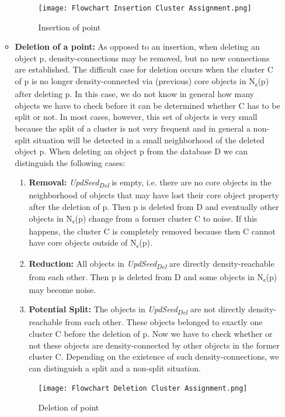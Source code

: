 \documentclass[acmsmall]{acmart}
\begin{document}
\begin{enumerate}
\begin{itemize}
        \begin{figure}[!h]
            \centering
            \texttt{[image: Flowchart Insertion Cluster Assignment.png]}
            \caption{Insertion of point}
            \label{fig:my_label}
        \end{figure}
        
        \item \textbf{Deletion of a point: }
        As opposed to an insertion, when deleting an object p, density-connections may be removed, but no new connections are established. The difficult case for deletion occurs when the cluster C of p is no longer density-connected via (previous) core objects in N\textsubscript{$\epsilon$}(p) after deleting p. In this case, we do not know in general how many objects we have to check before it can be determined whether C has to be split or not. In most cases, however, this set of objects is very small because the split of a cluster is not very frequent and in general a non-split situation will be detected in a small neighborhood of the deleted object p. 
        When deleting an object p from the database D we can distinguish the following cases:
        \\ 
        \begin{enumerate}
            \item \textbf{Removal: } \textit{UpdSeed\textsubscript{Del}} is empty, i.e. there are no core objects in the neighborhood of objects that may have lost their core object property after the deletion of p. Then p is deleted from D and eventually other objects in N\textsubscript{$\epsilon$}(p) change from a former cluster C to noise. If this happens, the cluster C is completely removed because then C cannot have core objects outside of N\textsubscript{$\epsilon$}(p).
            \item \textbf{Reduction: } All objects in \textit{UpdSeed\textsubscript{Del}} are directly density-reachable
            from each other. Then p is deleted from D and some objects in N\textsubscript{$\epsilon$}(p) may become noise.
            \item \textbf{Potential Split: } The objects in \textit{UpdSeed\textsubscript{Del}} are not directly density-reachable from each other. These objects belonged to exactly one cluster C before the deletion of p. Now we have to check whether or not these objects are density-connected by other objects in the former cluster C. Depending on the existence of such density-connections, we can distinguish a split and a non-split situation.
        \end{enumerate}
        
        \begin{figure}[!h]
            \centering
            \texttt{[image: Flowchart Deletion Cluster Assignment.png]}
            \caption{Deletion of point}
            \label{fig:my_label}
        \end{figure}
    \end{itemize}
\end{enumerate}
\end{document}
